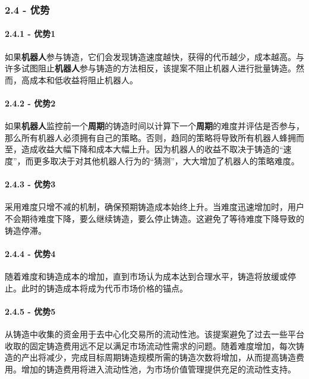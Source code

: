\documentclass[
]{article}
\begin{document}
\subsubsection{2.4 - 优势}\label{ux4f18ux52bf}

\paragraph{2.4.1 - 优势1}\label{ux4f18ux52bf1}

如果\textbf{机器人}参与铸造，它们会发现铸造速度越快，获得的代币越少，成本越高。与许多试图阻止\textbf{机器人}参与铸造的方法相反，该提案不阻止机器人进行批量铸造。然而，高成本和低收益将阻止机器人。

\paragraph{2.4.2 - 优势2}\label{ux4f18ux52bf2}

如果\textbf{机器人}监控前一个\textbf{周期}的铸造时间以计算下一个\textbf{周期}的难度并评估是否参与，那么所有机器人必须拥有自己的策略。否则，趋同的策略将导致所有机器人蜂拥而至，造成收益大幅下降和成本大幅上升。因为机器人的收益不取决于铸造的``速度''，而更多取决于对其他机器人行为的``猜测''，大大增加了机器人的策略难度。

\paragraph{2.4.3 - 优势3}\label{ux4f18ux52bf3}

采用难度只增不减的机制，确保预期铸造成本始终上升。当难度迅速增加时，用户不会期待难度下降，要么继续铸造，要么停止铸造。这避免了等待难度下降导致的铸造停滞。

\paragraph{2.4.4 - 优势4}\label{ux4f18ux52bf4}

随着难度和铸造成本的增加，直到市场认为成本达到合理水平，铸造将放缓或停止。此时的铸造成本将成为代币市场价格的锚点。

\paragraph{2.4.5 - 优势5}\label{ux4f18ux52bf5}

从铸造中收集的资金用于去中心化交易所的流动性池。该提案避免了过去一些平台收取的固定铸造费用远不足以满足市场流动性需求的问题。随着难度增加，每次铸造的产出将减少，完成目标周期铸造规模所需的铸造次数将增加，从而提高铸造费用。增加的铸造费用将进入流动性池，为市场价值管理提供充足的流动性支持。
\end{document}
